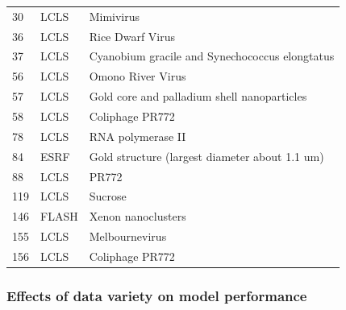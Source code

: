 \begin{table}
\begin{tabularx}{\textwidth}{ l l X }
            30       & LCLS         & Mimivirus                                                       \\
            36       & LCLS         & Rice Dwarf Virus                                                \\
            37       & LCLS         & Cyanobium gracile and Synechococcus elongtatus                  \\
            56       & LCLS         & Omono River Virus                                               \\
            57       & LCLS         & Gold core and palladium shell nanoparticles                     \\
            58       & LCLS         & Coliphage PR772                                                 \\
            78       & LCLS         & RNA polymerase II                                               \\
            84       & ESRF         & Gold structure (largest diameter about 1.1 um)                  \\
            88       & LCLS         & PR772                                                           \\
            119      & LCLS         & Sucrose                                                         \\
            146      & FLASH        & Xenon nanoclusters                                              \\
            155      & LCLS         & Melbournevirus                                                  \\
            156      & LCLS         & Coliphage PR772                                                 \\
        \end{tabularx}
\end{table}


\subsubsection{Effects of data variety on model performance}

